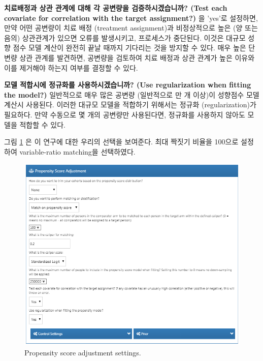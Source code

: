 \documentclass[11pt]{book}
\theoremstyle{definition}
\theoremstyle{definition}
\theoremstyle{definition}
\theoremstyle{remark}
\begin{document}
\textbf{치료배정과 상관 관계에 대해 각 공변량을 검증하시겠습니까? (Test
each covariate for correlation with the target assignment?)} 을 'yes'로
설정하면, 만약 어떤 공변량이 치료 배정 (treatment assignment)과
비정상적으로 높은 (양 또는 음의) 상관관계가 있으면 오류를 발생시키고,
프로세스가 중단된다. 이것은 대규모 성향 점수 모델 계산이 완전히 끝날
때까지 기다리는 것을 방지할 수 있다. 매우 높은 단변량 상관 관계를
발견하면, 공변량을 검토하여 치료 배정과 상관 관계가 높은 이유와 이를
제거해야 하는지 여부를 결정할 수 있다.

\textbf{모델 적합시에 정규화를 사용하시겠습니까? (Use regularization
when fitting the model?)} 일반적으로 매우 많은 공변량 (일반적으로 만 개
이상)이 성향점수 모델 계산시 사용된다. 이러한 대규모 모델을 적합하기
위해서는 정규화 (regularization)가 필요하다. 만약 수동으로 몇 개의
공변량만 사용된다면, 정규화를 사용하지 않아도 모델을 적합할 수 있다.

그림 \ref{fig:psSettings} 은 이 연구에 대한 우리의 선택을 보여준다. 최대
짝짓기 비율을 100으로 설정하여 variable-ratio matching을 선택하였다.

\begin{figure}

{\centering \includegraphics[width=1\linewidth]{images/PopulationLevelEstimation/psSettings} 

}

\caption{Propensity score adjustment settings.}\label{fig:psSettings}
\end{figure}
\end{document}
